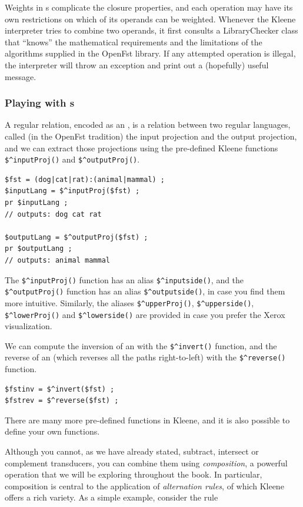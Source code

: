 Weights in \fsm{}s complicate the closure properties, and each operation
may have its own restrictions on which of its operands can be weighted.
Whenever the Kleene interpreter tries to combine two \fsm{} operands, it
first consults a LibraryChecker 
class that ``knows'' the mathematical requirements and
the limitations of the algorithms supplied in the OpenFst library.  If
any attempted operation is illegal, the interpreter will throw an
exception and print out a (hopefully) useful message.

\subsubsection{Playing with \fst{}s}

A regular relation, encoded as an \fst{}, is a relation between two regular languages,
called (in the OpenFst tradition) the input projection and the output projection, and we can extract those
projections using the pre-defined Kleene functions \verb!$^inputProj()!
and \verb!$^outputProj()!.


\begin{Verbatim}
$fst = (dog|cat|rat):(animal|mammal) ;
$inputLang = $^inputProj($fst) ;
pr $inputLang ;
// outputs: dog cat rat

$outputLang = $^outputProj($fst) ;
pr $outputLang ;
// outputs: animal mammal
\end{Verbatim}

The \verb!$^inputProj()! function has an alias \verb!$^inputside()!, and
the
\verb!$^outputProj()! function has an alias \verb!$^outputside()!, in
case you find them more intuitive.  Similarly, the aliases
\verb!$^upperProj()!, \verb!$^upperside()!, \verb!$^lowerProj()! and
\verb!$^lowerside()! are provided in case you prefer the Xerox
visualization.

We can compute the inversion of an \fst{} with the \verb!$^invert()!
function, and the reverse of an \fsm{} (which reverses all the paths right-to-left)
with the \verb!$^reverse()! function.


\begin{Verbatim}
$fstinv = $^invert($fst) ;
$fstrev = $^reverse($fst) ;
\end{Verbatim}

\noindent
There are many more pre-defined functions in Kleene, and it is also possible to define your own functions.

Although you cannot, as we have already stated, subtract, intersect or complement
transducers, you can combine them using \emph{composition}, a powerful operation that we
will be exploring throughout the book.
In particular, composition is central to the application of \emph{alternation rules}, of
which Kleene offers a rich variety.  As a simple example, consider the rule

